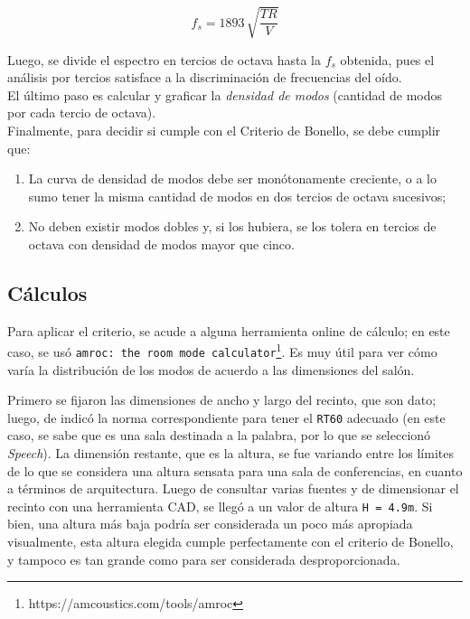 \begin{equation}
	f_s = 1893\,\sqrt{\frac{TR}{V}}
\end{equation}

Luego, se divide el espectro en tercios de octava hasta la $f_s$ obtenida, pues el análisis por tercios satisface a la discriminación de frecuencias del oído.\\

El último paso es calcular y graficar la \textit{densidad de modos} (cantidad de modos por cada tercio de octava).\\

Finalmente, para decidir si cumple con el Criterio de Bonello, se debe cumplir que:

\begin{enumerate}
	\item La curva de densidad de modos debe ser monótonamente creciente, o a lo sumo tener la misma cantidad de modos en dos tercios de octava sucesivos;
	\item No deben existir modos dobles y, si los hubiera, se los tolera en tercios de octava con densidad de modos mayor que cinco.
\end{enumerate}



\subsection{Cálculos}

Para aplicar el criterio, se acude a alguna herramienta online de cálculo; en este caso, se usó \texttt{amroc: the room mode calculator}\footnote{https://amcoustics.com/tools/amroc}. Es muy útil para ver cómo varía la distribución de los modos de acuerdo a las dimensiones del salón.\\


Primero se fijaron las dimensiones de ancho y largo del recinto, que son dato; luego, de indicó la norma correspondiente para tener el \texttt{RT60} adecuado (en este caso, se sabe que es una sala destinada a la palabra, por lo que se seleccionó \textit{Speech}). La dimensión restante, que es la altura, se fue variando entre los límites de lo que se considera una altura sensata para una sala de conferencias, en cuanto a términos de arquitectura. Luego de consultar varias fuentes y de dimensionar el recinto con una herramienta CAD, se llegó a un valor de altura \texttt{H = 4.9m}. Si bien, una altura más baja podría ser considerada un poco más apropiada visualmente, esta altura elegida cumple perfectamente con el criterio de Bonello, y tampoco es tan grande como para ser considerada desproporcionada.

